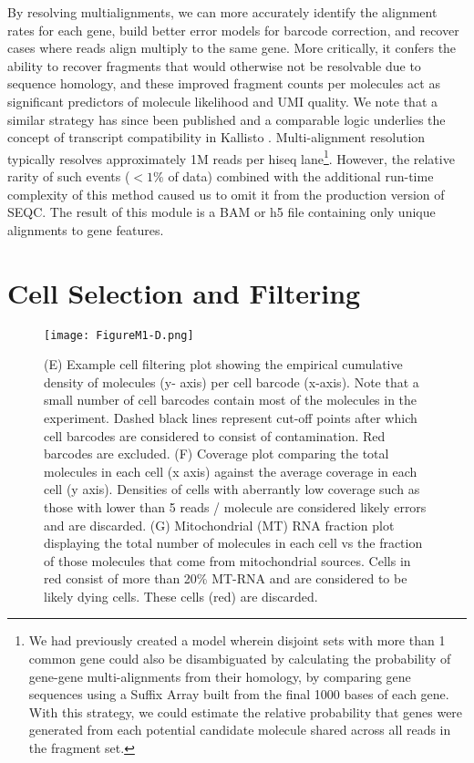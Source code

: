 By resolving multialignments, we can more accurately identify the alignment rates for each gene, build better error models for barcode correction, and recover cases where reads align multiply to the same gene. 
More critically, it confers the ability to recover fragments that would otherwise not be resolvable due to sequence homology, and these improved fragment counts per molecules act as significant predictors of molecule likelihood and UMI quality. 
We note that a similar strategy has since been published \citep{Klein2015} and a comparable logic underlies the concept of transcript compatibility in Kallisto \citep{Bray2016}.
Multi-alignment resolution typically resolves approximately 1M reads per hiseq lane\footnote{We had previously created a model wherein disjoint sets with more than 1 common gene could also be disambiguated by calculating the probability of gene-gene multi-alignments from their homology, by comparing gene sequences using a Suffix Array built from the final 1000 bases of each gene. With this strategy, we could estimate the relative probability that genes were generated from each potential candidate molecule shared across all reads in the fragment set.}. 
However, the relative rarity of such events ($<1\%$ of data) combined with the additional run-time complexity of this method caused us to omit it from the production version of SEQC\@. 
The result of this module is a BAM or h5 file containing only unique alignments to gene features.
 
\section{Cell Selection and Filtering}

\begin{figure}
\centering
\texttt{[image: FigureM1-D.png]}
\caption{(E) Example cell filtering plot showing the empirical cumulative density of molecules (y-
axis) per cell barcode (x-axis). Note that a small number of cell barcodes contain most of
the molecules in the experiment. Dashed black lines represent cut-off points after which
cell barcodes are considered to consist of contamination. Red barcodes are excluded.
(F) Coverage plot comparing the total molecules in each cell (x axis) against the average
coverage in each cell (y axis). Densities of cells with aberrantly low coverage such as
those with lower than 5 reads / molecule are considered likely errors and are discarded.
(G) Mitochondrial (MT) RNA fraction plot displaying the total number of molecules in
each cell vs the fraction of those molecules that come from mitochondrial sources. Cells
in red consist of more than 20\% MT-RNA and are considered to be likely dying cells.
These cells (red) are discarded.}
\label{fig:m1d}
\end{figure}

